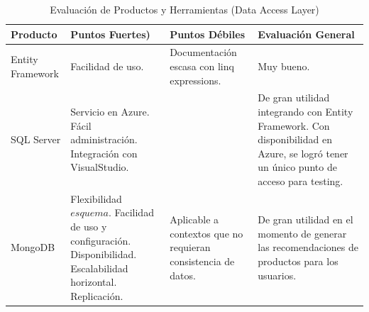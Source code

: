 \documentclass[journal]{IEEEtran}
\begin{document}
\begin{table}

\begin{center}
    \begin{tabular}{| p{1.5cm} | p{1.8cm} | p{1.8cm} | p{1.8cm} |}
    \hline
    \textbf{Producto} & \textbf{Puntos Fuertes)} & \textbf{Puntos Débiles} & \textbf{Evaluación General} \\ \hline
    Entity Framework &
    Facilidad de uso. &
    Documentación escasa con linq expressions. &
    Muy bueno.  \\ \hline
    
    SQL Server & 
    Servicio en Azure. Fácil administración. Integración con VisualStudio. & 
    &
    De gran utilidad integrando con Entity Framework. Con disponibilidad en Azure, se logró tener un único punto de acceso para testing. \\ \hline
    
    MongoDB &
    Flexibilidad $esquema$. Facilidad de uso y configuración. Disponibilidad. Escalabilidad horizontal. Replicación. &
    Aplicable a contextos que no requieran consistencia de datos. &
    De gran utilidad en el momento de generar las recomendaciones de productos para los usuarios. \\ \hline
    
    
    \end{tabular}
\end{center}
    \caption{Evaluación de Productos y Herramientas (Data Access Layer)}
    \label{tabla:dal}
\end{table}
\end{document}
